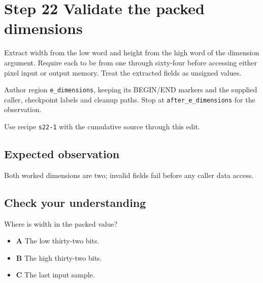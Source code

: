 \section{Step 22 Validate the packed dimensions}\label{ppm-s22}

Extract width from the low word and height from the high word of the dimension argument. Require each to be from one through sixty-four before accessing either pixel input or output memory. Treat the extracted fields as unsigned values.

Author region \texttt{e\_dimensions}, keeping its BEGIN/END markers and the supplied caller, checkpoint labels and cleanup paths. Stop at \texttt{after\_e\_dimensions} for the observation.

Use recipe \texttt{s22-1} with the cumulative source through this edit.

\subsection{Expected observation}
Both worked dimensions are two; invalid fields fail before any caller data access.

\subsection{Check your understanding}
Where is width in the packed value?

\begin{itemize}
\item \textbf{A} The low thirty-two bits.
\item \textbf{B} The high thirty-two bits.
\item \textbf{C} The last input sample.
\end{itemize}
